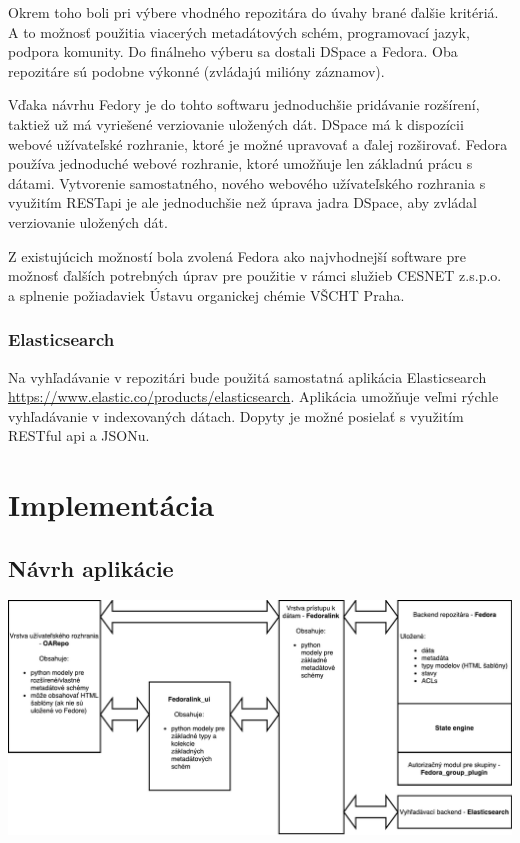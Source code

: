 \documentclass[thesis=M,slovak]{FITthesis}[2013/05/06]
\begin{document}
Okrem toho boli pri výbere vhodného repozitára do úvahy brané ďalšie kritériá. A to možnosť použitia viacerých metadátových schém, programovací jazyk, podpora komunity. Do finálneho výberu sa dostali DSpace a Fedora. Oba repozitáre sú podobne výkonné (zvládajú milióny záznamov).

Vďaka návrhu Fedory je do tohto softwaru jednoduchšie pridávanie rozšírení, taktiež už má vyriešené verziovanie uložených dát. DSpace má k dispozícii webové užívateľské rozhranie, ktoré je možné upravovať a ďalej rozširovať. Fedora používa jednoduché webové rozhranie, ktoré umožňuje len základnú prácu s dátami. Vytvorenie samostatného, nového webového užívateľského rozhrania s využitím RESTapi je ale jednoduchšie než úprava jadra DSpace, aby zvládal verziovanie uložených dát.

Z existujúcich možností bola zvolená Fedora ako najvhodnejší software pre možnosť ďalších potrebných úprav pre použitie v rámci služieb CESNET z.s.p.o. a splnenie požiadaviek Ústavu organickej chémie VŠCHT Praha.

\subsection{Elasticsearch}
Na vyhľadávanie v repozitári bude použitá samostatná aplikácia Elasticsearch \url{https://www.elastic.co/products/elasticsearch}. Aplikácia umožňuje veľmi rýchle vyhľadávanie v indexovaných dátach. Dopyty je možné posielať s využitím RESTful api a JSONu.


\chapter{Implementácia}
\section{Návrh aplikácie}
\includegraphics[width=1.0\textwidth]{diagramy/Architektura_repozitara.pdf}
\end{document}
